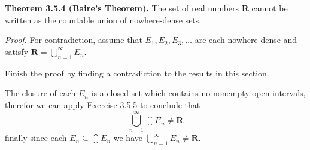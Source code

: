 \begin{solution}
\end{solution}

\begin{exercise}
  \textbf{Theorem 3.5.4 (Baire's Theorem).} The set of real numbers $\mathbf{R}$ cannot be written as the countable union of nowhere-dense sets.

  \textit{Proof.} For contradiction, assume that $E_{1}, E_{2}, E_{3}, \ldots$ are each nowhere-dense and satisfy $\mathbf{R}=\bigcup_{n=1}^{\infty} E_{n}$.

  Finish the proof by finding a contradiction to the results in this section.
\end{exercise}

\begin{solution}
  The closure of each $E_n$ is a closed set which contains no nonempty open intervals, therefor we can apply Exercise 3.5.5 to conclude that
  $$
  \bigcup_{n=1}^\infty \closure{E_n} \ne \mathbf{R}
  $$
  finally since each $E_n \subseteq \closure{E_n}$ we have $\bigcup_{n=1}^\infty E_n \ne \mathbf{R}$.
\end{solution}
